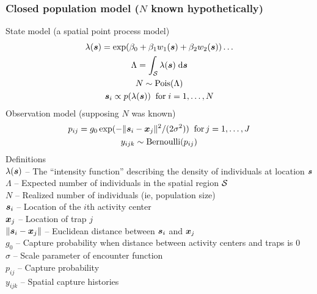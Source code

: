 \documentclass[color=usenames,dvipsnames]{beamer}\usepackage[]{graphicx}\usepackage[]{xcolor}
\begin{document}
\begin{frame}
  \frametitle{\large Closed population model ($N$ known hypothetically) }
  \footnotesize
  State model (a spatial point process model) %
  \begin{gather*}
    \lambda({\bm s}) = \exp(\beta_0 + \beta_1 w_1({\bm s}) + \beta_2 w_2({\bm s})) \dots \\
    \Lambda = \int_{\mathcal{S}} \lambda({\bm s}) \; \mathrm{d}{\bm s} \\
    N \sim \mathrm{Pois}(\Lambda) \\
    {\bm s}_i \propto p(\lambda({\bm s})) \;\; \mathrm{for}\; i=1,\dots,N 
  \end{gather*}
  Observation model (supposing $N$ was known)
  \begin{gather*}
    p_{ij} = g_0\exp(-\|{\bm s}_i - {\bm x}_j\|^2/(2\sigma^2))  \;\; \mathrm{for}\, j=1,\dots,J  \\
    y_{ijk} \sim \mathrm{Bernoulli}(p_{ij})
  \end{gather*}
  \scriptsize
  Definitions \\
  \hangindent=0.9cm $\lambda({\bm s})$ -- The ``intensity function'' %
  describing the density of individuals at location ${\bm s}$ \\ 
  $\Lambda$ -- Expected number of individuals in the spatial region $\cal S$ \\
  $N$ -- Realized number of individuals (ie, population size) \\
  ${\bm s}_i$ -- Location of the $i$th activity center \\
  ${\bm x}_j$ -- Location of trap $j$ \\
  $\|{\bm s}_i - {\bm x}_j\|$ -- Euclidean distance between ${\bm s}_i$ and ${\bm x}_j$ \\
  $g_0$ -- Capture probability when distance between activity centers
  and traps is 0 \\
  $\sigma$ -- Scale parameter of encounter function \\
  $p_{ij}$ -- Capture probability \\
  $y_{ijk}$ -- Spatial capture histories \\
\end{frame}
\end{document}
